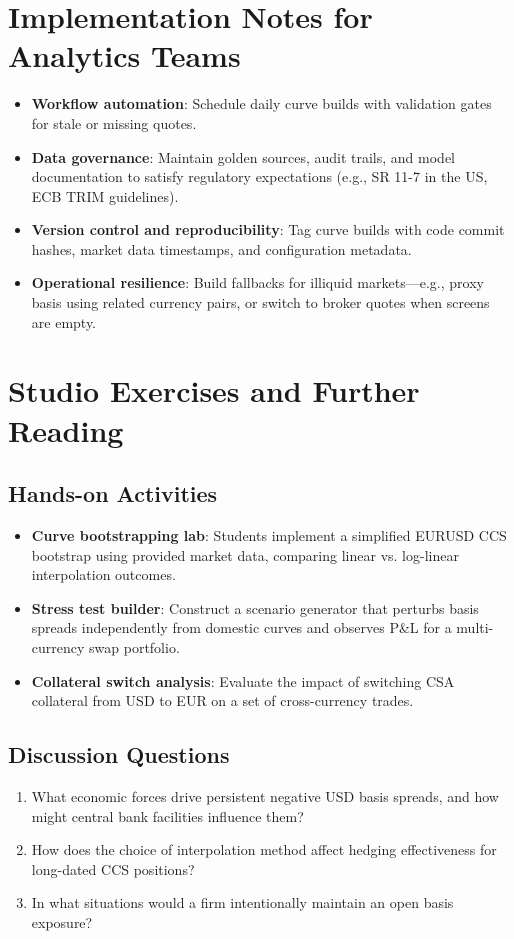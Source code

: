 \documentclass[11pt]{article}
\begin{document}
\section{Implementation Notes for Analytics Teams}
\begin{itemize}[leftmargin=*]
  \item \textbf{Workflow automation}: Schedule daily curve builds with validation gates for stale or missing quotes.
  \item \textbf{Data governance}: Maintain golden sources, audit trails, and model documentation to satisfy regulatory expectations (e.g., SR 11-7 in the US, ECB TRIM guidelines).
  \item \textbf{Version control and reproducibility}: Tag curve builds with code commit hashes, market data timestamps, and configuration metadata.
  \item \textbf{Operational resilience}: Build fallbacks for illiquid markets---e.g., proxy basis using related currency pairs, or switch to broker quotes when screens are empty.
\end{itemize}

\section{Studio Exercises and Further Reading}
\subsection{Hands-on Activities}
\begin{itemize}[leftmargin=*]
  \item \textbf{Curve bootstrapping lab}: Students implement a simplified EURUSD CCS bootstrap using provided market data, comparing linear vs. log-linear interpolation outcomes.
  \item \textbf{Stress test builder}: Construct a scenario generator that perturbs basis spreads independently from domestic curves and observes P\&L for a multi-currency swap portfolio.
  \item \textbf{Collateral switch analysis}: Evaluate the impact of switching CSA collateral from USD to EUR on a set of cross-currency trades.
\end{itemize}

\subsection{Discussion Questions}
\begin{enumerate}[leftmargin=*]
  \item What economic forces drive persistent negative USD basis spreads, and how might central bank facilities influence them?
  \item How does the choice of interpolation method affect hedging effectiveness for long-dated CCS positions?
  \item In what situations would a firm intentionally maintain an open basis exposure?
\end{enumerate}
\end{document}
